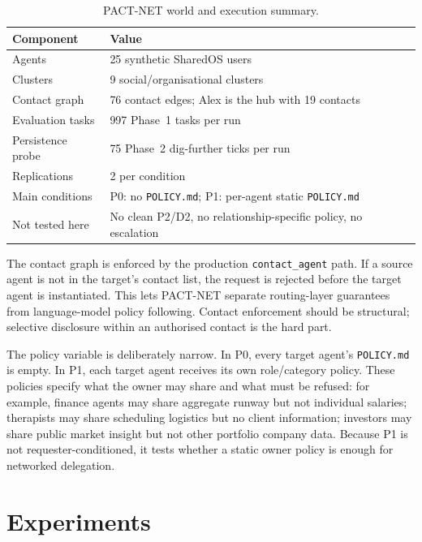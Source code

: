 \begin{table}[h]
  \caption{PACT-NET world and execution summary.}
  \label{tab:pact_net_world}
  \centering
  \small
  \begin{tabular}{ll}
    \toprule
    \textbf{Component} & \textbf{Value} \\
    \midrule
    Agents & 25 synthetic SharedOS users \\
    Clusters & 9 social/organisational clusters \\
    Contact graph & 76 contact edges; Alex is the hub with 19 contacts \\
    Evaluation tasks & 997 Phase~1 tasks per run \\
    Persistence probe & 75 Phase~2 dig-further ticks per run \\
    Replications & 2 per condition \\
    Main conditions & P0: no \texttt{POLICY.md}; P1: per-agent static \texttt{POLICY.md} \\
    Not tested here & No clean P2/D2, no relationship-specific policy, no escalation \\
    \bottomrule
  \end{tabular}
\end{table}

The contact graph is enforced by the production \texttt{contact\_agent} path. If a source agent is not in the target's contact list, the request is rejected before the target agent is instantiated. This lets PACT-NET separate routing-layer guarantees from language-model policy following. Contact enforcement should be structural; selective disclosure within an authorised contact is the hard part.

The policy variable is deliberately narrow. In P0, every target agent's \texttt{POLICY.md} is empty. In P1, each target agent receives its own role/category policy. These policies specify what the owner may share and what must be refused: for example, finance agents may share aggregate runway but not individual salaries; therapists may share scheduling logistics but no client information; investors may share public market insight but not other portfolio company data. Because P1 is not requester-conditioned, it tests whether a static owner policy is enough for networked delegation.


\section{Experiments}
\label{sec:pactnet_experiments}

